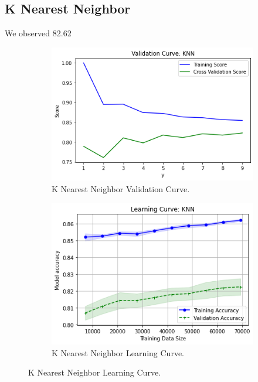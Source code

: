 \subsection{K Nearest Neighbor}
We observed 82.62 %
\begin{figure}[h]
\centering
\begin{subfigure}[b]{0.45\linewidth}
    \includegraphics[width=\linewidth]{knnvc}
    \caption{K Nearest Neighbor Validation Curve.}
\end{subfigure}
\begin{subfigure}[b]{0.45\linewidth}
    \includegraphics[width=\linewidth]{knnlc}
    \caption{K Nearest Neighbor Learning Curve.}
\end{subfigure}
\end{figure}

\clearpage

